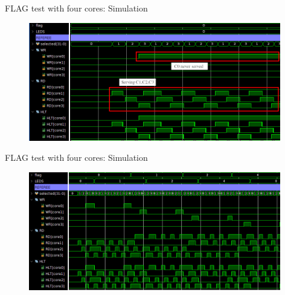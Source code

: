 \begin{frame}{FLAG test with four cores: Simulation}
\begin{figure}
    \centering
    \includegraphics[width=11cm]{images/flag4_sim_bad_crop_arrow.png}
    \label{fig:my_label}
\end{figure}
\end{frame}

\begin{frame}{FLAG test with four cores: Simulation}
\begin{figure}
    \centering
    \includegraphics[width=11cm]{images/flag4_sim_good_crop.png}
    \label{fig:my_label}
\end{figure}
\end{frame}

